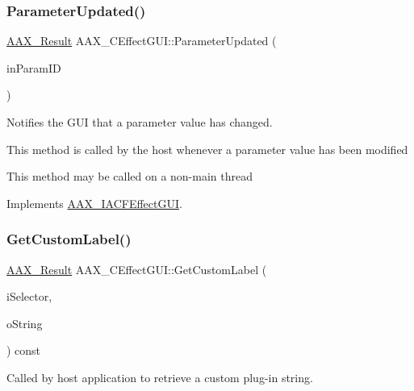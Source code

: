 \subsubsection{\texorpdfstring{ParameterUpdated()}{ParameterUpdated()}}
{\footnotesize\ttfamily \mbox{\hyperlink{a00392_a4d8f69a697df7f70c3a8e9b8ee130d2f}{A\+A\+X\+\_\+\+Result}} A\+A\+X\+\_\+\+C\+Effect\+G\+U\+I\+::\+Parameter\+Updated (\begin{DoxyParamCaption}\item[{\mbox{\hyperlink{a00392_a1440c756fe5cb158b78193b2fc1780d1}{A\+A\+X\+\_\+\+C\+Param\+ID}}}]{in\+Param\+ID }\end{DoxyParamCaption})\hspace{0.3cm}{\ttfamily [virtual]}}



Notifies the G\+UI that a parameter value has changed. 

This method is called by the host whenever a parameter value has been modified

This method may be called on a non-\/main thread 

Implements \mbox{\hyperlink{a01665_a45b468fef806611581f748af9301ab4d}{A\+A\+X\+\_\+\+I\+A\+C\+F\+Effect\+G\+UI}}.

\mbox{\label{a01477_aa903a721baf5a5cfd0b959d0d8dbb874}} 
\subsubsection{\texorpdfstring{GetCustomLabel()}{GetCustomLabel()}}
{\footnotesize\ttfamily \mbox{\hyperlink{a00392_a4d8f69a697df7f70c3a8e9b8ee130d2f}{A\+A\+X\+\_\+\+Result}} A\+A\+X\+\_\+\+C\+Effect\+G\+U\+I\+::\+Get\+Custom\+Label (\begin{DoxyParamCaption}\item[{\mbox{\hyperlink{a00491_a86f7310877399d9d4d2ea4863d472476}{A\+A\+X\+\_\+\+E\+Plug\+In\+Strings}}}]{i\+Selector,  }\item[{\mbox{\hyperlink{a01873}{A\+A\+X\+\_\+\+I\+String}} $\ast$}]{o\+String }\end{DoxyParamCaption}) const\hspace{0.3cm}{\ttfamily [virtual]}}



Called by host application to retrieve a custom plug-\/in string. 

